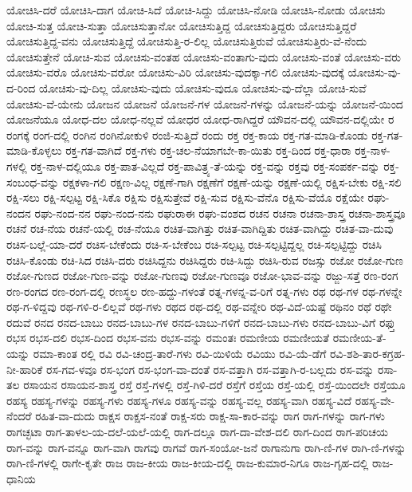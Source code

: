 {ಯೋಚಿಸಿ-ದರೆ
ಯೋಚಿಸಿ-ದಾಗ
ಯೋಚಿ-ಸಿದೆ
ಯೋಚಿ-ಸಿದ್ದು
ಯೋಚಿಸಿ-ನೋಡಿ
ಯೋಚಿಸಿ-ನೋಡು
ಯೋಚಿಸು
ಯೋಚಿ-ಸುತ್ತ
ಯೋಚಿ-ಸುತ್ತಾ
ಯೋಚಿಸುತ್ತಾನೋ
ಯೋಚಿಸುತ್ತಿದ್ದ
ಯೋಚಿಸುತ್ತಿದ್ದರು
ಯೋಚಿಸುತ್ತಿದ್ದರೆ
ಯೋಚಿಸುತ್ತಿದ್ದ-ವನು
ಯೋಚಿಸುತ್ತಿದ್ದೆ
ಯೋಚಿಸುತ್ತಿ-ರ-ಲಿಲ್ಲ
ಯೋಚಿಸುತ್ತಿರುವೆ
ಯೋಚಿಸುತ್ತಿರು-ವೆ-ನೆಂದು
ಯೋಚಿಸುತ್ತೇನೆ
ಯೋಚಿ-ಸುವ
ಯೋಚಿಸು-ವಂತಹ
ಯೋಚಿಸು-ವಂತಾಗು-ವುದು
ಯೋಚಿಸು-ವಂತೆ
ಯೋಚಿಸು-ವರು
ಯೋಚಿಸು-ವರೊ
ಯೋಚಿಸು-ವರೋ
ಯೋಚಿಸು-ವಿರಿ
ಯೋಚಿಸು-ವುದಕ್ಕಾ-ಗಲಿ
ಯೋಚಿಸು-ವುದಕ್ಕೆ
ಯೋಚಿಸು-ವು-ದ-ರಿಂದ
ಯೋಚಿಸು-ವು-ದಿಲ್ಲ
ಯೋಚಿಸು-ವುದು
ಯೋಚಿಸು-ವುದೂ
ಯೋಚಿಸು-ವು-ದೆಲ್ಲಾ
ಯೋಚಿ-ಸುವೆ
ಯೋಚಿಸು-ವೆ-ಯೇನು
ಯೋಜನ
ಯೋಜನೆ
ಯೋಜನೆ-ಗಳ
ಯೋಜನೆ-ಗಳನ್ನು
ಯೋಜನೆ-ಯನ್ನು
ಯೋಜನೆ-ಯಿಂದ
ಯೋಜನೆಯೂ
ಯೋಧ-ದಲ
ಯೋಧ-ನಲ್ಲವೆ
ಯೋಧರ
ಯೋಧ-ರಾಗಿದ್ದರೆ
ಯೌವನ-ದಲ್ಲಿ
ಯೌವನ-ದಲ್ಲಿಯೇ
ರ
ರಂಗಕ್ಕೆ
ರಂಗ-ದಲ್ಲಿ
ರಂಗಿನ
ರಂಗಿನೋಕುಳಿ
ರಂಜಿ-ಸುತ್ತಿದೆ
ರಂದು
ರಕ್ತ
ರಕ್ತ-ಕಾಯ
ರಕ್ತ-ಗತ-ಮಾಡಿ-ಕೊಂಡು
ರಕ್ತ-ಗತ-ಮಾಡಿ-ಕೊಳ್ಳಲು
ರಕ್ತ-ಗತ-ವಾಗಿದೆ
ರಕ್ತ-ಗಳು
ರಕ್ತ-ಚಲ-ನೆಯಾಗಬೇ-ಕಾ-ಯಿತು
ರಕ್ತ-ದಿಂದ
ರಕ್ತ-ಧಾರಾ
ರಕ್ತ-ನಾಳ-ಗಳಲ್ಲಿ
ರಕ್ತ-ನಾಳ-ದಲ್ಲಿಯೂ
ರಕ್ತ-ಪಾತ-ವಿಲ್ಲದೆ
ರಕ್ತ-ಪಾವಿತ್ರ್ಯ-ತೆ-ಯನ್ನು
ರಕ್ತ-ವನ್ನು
ರಕ್ತವು
ರಕ್ತ-ಸಂಪರ್ಕ-ವನ್ನು
ರಕ್ತ-ಸಂಬಂಧ-ವನ್ನು
ರಕ್ಷಕಳಾ-ಗಲಿ
ರಕ್ಷಣ-ವಿಲ್ಲ
ರಕ್ಷಣೆ-ಗಾಗಿ
ರಕ್ಷಣೆಗೆ
ರಕ್ಷಣೆ-ಯನ್ನು
ರಕ್ಷಣೆ-ಯಲ್ಲಿ
ರಕ್ಷಿಸ-ಬೇಕು
ರಕ್ಷಿ-ಸಲಿ
ರಕ್ಷಿ-ಸಲು
ರಕ್ಷಿ-ಸಲ್ಪಟ್ಟ
ರಕ್ಷಿ-ಸಿಕೊ
ರಕ್ಷಿಸು
ರಕ್ಷಿಸುತ್ತೇವೆ
ರಕ್ಷಿ-ಸುವ
ರಕ್ಷಿಸು-ವೆನೊ
ರಕ್ಷಿಸು-ವೆಯೊ
ರಕ್ಷೆಯೇ
ರಘು-ನಂದನ
ರಘು-ನಂದ-ನನ
ರಘು-ನಂದ-ನನು
ರಘುರಾಈ
ರಘು-ವಂಶದ
ರಚನ
ರಚನಾ
ರಚನಾ-ಶಾಸ್ತ್ರ
ರಚನಾ-ಶಾಸ್ತ್ರವೂ
ರಚನೆ
ರಚ-ನೆಯ
ರಚನೆ-ಯಲ್ಲಿ
ರಚ-ನೆಯೂ
ರಚಿತ-ವಾಗಿತ್ತು
ರಚಿತ-ವಾಗಿದ್ದಿತು
ರಚಿತ-ವಾಗಿದ್ದು
ರಚಿತ-ವಾ-ದುವು
ರಚಿಸ-ಬಲ್ಲೆ-ಯಾ-ದರೆ
ರಚಿಸ-ಬೇಕೆಂದು
ರಚಿ-ಸ-ಬೇಕೆಂಬ
ರಚಿ-ಸಲ್ಪಟ್ಟ
ರಚಿ-ಸಲ್ಪಟ್ಟಿದ್ದಲ್ಲ
ರಚಿ-ಸಲ್ಪಟ್ಟಿದ್ದು
ರಚಿಸಿ
ರಚಿಸಿ-ಕೊಂಡು
ರಚಿ-ಸಿದ
ರಚಿಸಿ-ದರು
ರಚಿಸಿದ್ದನು
ರಚಿಸಿದ್ದರು
ರಚಿ-ಸಿದ್ದು
ರಚಿಸಿ-ರುವ
ರಜಸ್ಸು
ರಜೋ
ರಜೋ-ಗುಣ
ರಜೋ-ಗುಣದ
ರಜೋ-ಗುಣ-ವನ್ನು
ರಜೋ-ಗುಣವು
ರಜೋ-ಗುಣವೂ
ರಜೋ-ಭಾವ-ವನ್ನು
ರಜ್ಜು-ಸತ್ತೆ
ರಣ-ರಂಗ
ರಣ-ರಂಗದ
ರಣ-ರಂಗ-ದಲ್ಲಿ
ರಣಸ್ಥಲ
ರಣ-ಹದ್ದು-ಗಳಂತೆ
ರತ್ನ-ಗಳನ್ನ-ವ-ರಿಗೆ
ರತ್ನ-ಗಳು
ರಥ
ರಥ-ಗಳ
ರಥ-ಗಳನ್ನೇ
ರಥ-ಗ-ಳಿದ್ದವು
ರಥ-ಗಳಿ-ರ-ಲಿಲ್ಲವೆ
ರಥ-ಗಳು
ರಥದ
ರಥ-ದಲ್ಲಿ
ರಥ-ವನ್ನೇರಿ
ರಥ-ವಿದೆ-ಯಷ್ಟೆ
ರಥಿನಂ
ರಥೆ
ರಥೇ
ರದುವೆ
ರನದ
ರನದ-ಬಾಬು
ರನದ-ಬಾಬು-ಗಳ
ರನದ-ಬಾಬು-ಗಳಿಗೆ
ರನದ-ಬಾಬು-ಗಳು
ರನದ-ಬಾಬು-ವಿಗೆ
ರಫ್ತು
ರಭಸ
ರಭಸ-ದಲಿ
ರಭಸ-ದಿಂದ
ರಭಸ-ವನು
ರಭಸ-ವನ್ನು
ರಮಂತಃ
ರಮಣೀಯ
ರಮಣೀಯತೆ
ರಮಣೀಯ-ತೆ-ಯನ್ನು
ರಮಾ-ಕಾಂತ
ರಲ್ಲಿ
ರವಿ
ರವಿ-ಚಂದ್ರ-ತಾರೆ-ಗಳು
ರವಿ-ಯಿಳಿಯೆ
ರವಿಯು
ರವಿ-ಯೆ-ಡೆಗೆ
ರವಿ-ಶಶಿ-ತಾರ-ಕಗ್ರಹ-ನೀ-ಹಾರಿಕೆ
ರಸ-ಗವ-ಳವೂ
ರಸ-ಭಂಗ
ರಸ-ಭಂಗ-ವಾ-ದಂತೆ
ರಸ-ವತ್ತಾಗಿ
ರಸ-ವತ್ತಾಗಿ-ರ-ಬಲ್ಲದು
ರಸ-ವನ್ನು
ರಸಾ-ತಲ
ರಸಾಯನ
ರಸಾಯನ-ಶಾಸ್ತ್ರ
ರಸ್ತೆ
ರಸ್ತೆ-ಗಳಲ್ಲಿ
ರಸ್ತೆ-ಗಿಳಿ-ದರೆ
ರಸ್ತೆಗೆ
ರಸ್ತೆಯ
ರಸ್ತೆ-ಯಲ್ಲಿ
ರಸ್ತೆ-ಯಿಂದಲೇ
ರಸ್ತೆಯೂ
ರಹಸ್ಯ
ರಹಸ್ಯ-ಗಳನ್ನು
ರಹಸ್ಯ-ಗಳು
ರಹಸ್ಯ-ಗಳೂ
ರಹಸ್ಯ-ವನ್ನು
ರಹಸ್ಯ-ವಲ್ಲ
ರಹಸ್ಯ-ವಾಗಿ
ರಹಸ್ಯ-ವಿದೆ
ರಹಸ್ಯ-ವೇ-ನೆಂದರೆ
ರಹಿತ-ವಾ-ದುದು
ರಾಕ್ಷಸ
ರಾಕ್ಷಸ-ನಂತೆ
ರಾಕ್ಷ-ಸರು
ರಾಕ್ಷ-ಸಾ-ಕಾರ-ವನ್ನು
ರಾಗ
ರಾಗ-ಗಳನ್ನು
ರಾಗ-ಗಳು
ರಾಗಚ್ಛಟಾ
ರಾಗ-ತಾಳಲ-ಯ-ದಲೆ-ಯಲೆ-ಯಲ್ಲಿ
ರಾಗ-ದಲ್ಲೂ
ರಾಗ-ದಾ-ವೇಶ-ದಲಿ
ರಾಗ-ದಿಂದ
ರಾಗ-ಪರಿಚಯ
ರಾಗ-ವನ್ನು
ರಾಗ-ವನ್ನೂ
ರಾಗ-ವಾಗಿ
ರಾಗವು
ರಾಗವೆ
ರಾಗ-ಸಂಯೋ-ಜನೆ
ರಾಗಾನುಗಾ
ರಾಗಿ-ಣಿ-ಗಳ
ರಾಗಿ-ಣಿ-ಗಳನ್ನು
ರಾಗಿ-ಣಿ-ಗಳಲ್ಲಿ
ರಾಗೇ-ಕೃತೇ
ರಾಜ
ರಾಜ-ಕೀಯ
ರಾಜ-ಕೀಯ-ದಲ್ಲಿ
ರಾಜ-ಕುಮಾರ-ನಿಗೂ
ರಾಜ-ಗೃಹ-ದಲ್ಲಿ
ರಾಜ-ಧಾನಿಯ
}
